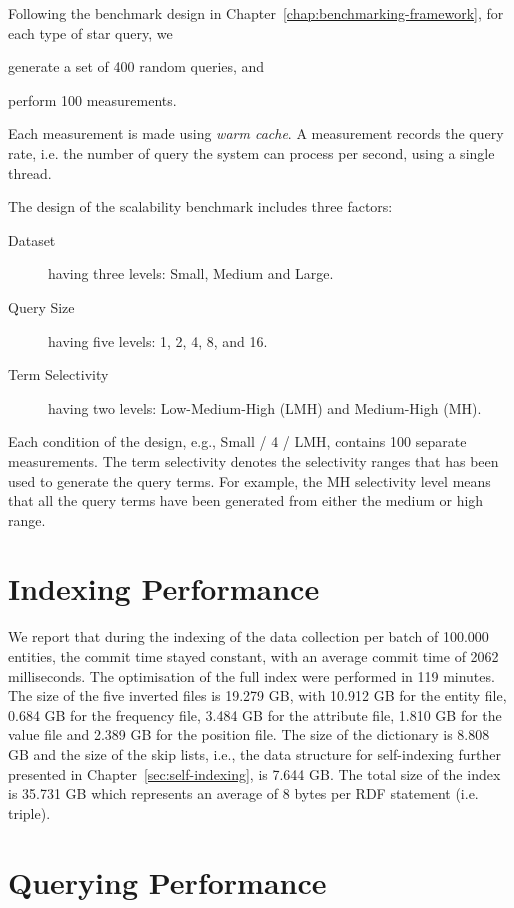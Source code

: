 Following the benchmark design in Chapter~\ref{chap:benchmarking-framework}, for
each type of star query, we \begin{inparaenum}[(1)]
\item generate a set of 400 random queries, and 
\item perform 100 measurements.
\end{inparaenum}
Each measurement is made using \emph{warm cache}. A measurement records the
query rate, i.e. the number of query the system can process per second, using
a single thread.

The design of the scalability benchmark includes three factors:
\begin{description}
\item[Dataset] having three levels: Small, Medium and Large. 
\item[Query Size] having five levels: 1, 2, 4, 8, and 16.
\item[Term Selectivity] having two levels: Low-Medium-High (LMH) and
Medium-High (MH).
\end{description}
Each condition of the design, e.g., Small / 4 / LMH, contains 100 separate
measurements. The term selectivity denotes the selectivity ranges that has
been used to generate the query terms. For example, the MH selectivity level
means that all the query terms have been generated from either the medium or
high range.
 
\section{Indexing Performance}

We report that during the indexing of the data collection per batch of 100.000
entities, the commit time stayed constant, with an average commit time of 2062
milliseconds. The optimisation of the full index were performed in 119
minutes. The size of the five inverted files is 19.279 GB, with 10.912 GB for
the entity file, 0.684 GB for the frequency file, 3.484 GB for the attribute
file, 1.810 GB for the value file and 2.389 GB for the position file. The size
of the dictionary is 8.808 GB and the size of the skip lists, i.e., the data
structure for self-indexing further presented in
Chapter~\ref{sec:self-indexing}, is 7.644 GB. The total size of the index is
35.731 GB which represents an average of 8 bytes per RDF statement (i.e.
triple).

\section{Querying Performance}
\label{sec:scalability:query}

